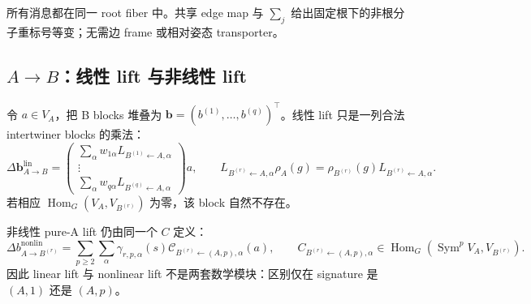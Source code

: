 \documentclass[11pt,a4paper,fontset=fandol]{ctexart}
\newcommand{\Sym}{\operatorname{Sym}}
\newcommand{\Hom}{\operatorname{Hom}}
\newcommand{\one}{\mathbf 1}
\begin{document}
\begin{center}
\end{center}

所有消息都在同一 root fiber 中。共享 edge map 与 $\sum_j$ 给出固定根下的非根分子重标号等变；无需边 frame 或相对姿态 transporter。

\subsection{$A\to B$：线性 lift 与非线性 lift}

令 $a\in V_A$，把 B blocks 堆叠为 $\bm b=(b^{(1)},\ldots,b^{(q)})^\top$。线性 lift 只是一列合法 intertwiner blocks 的乘法：
\begin{equation}
  \Delta\bm b_{A\to B}^{\mathrm{lin}}
  =
  \begin{pmatrix}
    \sum_\alpha w_{1\alpha}L_{B^{(1)}\leftarrow A,\alpha}\\
    \vdots\\
    \sum_\alpha w_{q\alpha}L_{B^{(q)}\leftarrow A,\alpha}
  \end{pmatrix}a,
  \qquad
  L_{B^{(r)}\leftarrow A,\alpha}\rho_A(g)
  =\rho_{B^{(r)}}(g)L_{B^{(r)}\leftarrow A,\alpha}.
  \label{eq:linear-a-b}
\end{equation}
若相应 $\Hom_G(V_A,V_{B^{(r)}})$ 为零，该 block 自然不存在。

非线性 pure-A lift 仍由同一个 $C$ 定义：
\begin{equation}
  \Delta b_{A\to B^{(r)}}^{\mathrm{nonlin}}
  =\sum_{p\ge2}\sum_\alpha
  \gamma_{r,p,\alpha}(s)
  \mathcal C_{B^{(r)}\leftarrow (A,p),\alpha}(a),
  \qquad
  C_{B^{(r)}\leftarrow(A,p),\alpha}
  \in\Hom_G(\Sym^pV_A,V_{B^{(r)}}).
  \label{eq:nonlinear-a-b}
\end{equation}
因此 linear lift 与 nonlinear lift 不是两套数学模块：区别仅在 signature 是 $(A,1)$ 还是 $(A,p)$。
\end{document}
